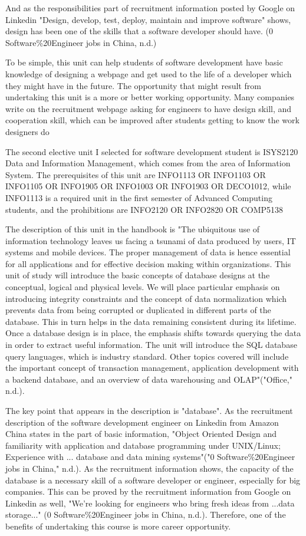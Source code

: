 \documentclass[12pt]{article}
\begin{document}
And as the responsibilities part of recruitment information posted by Google on Linkedin "Design, develop, test, deploy, maintain and improve software" shows, design has been one of the skills that a software developer should have. (0 Software\%20Engineer jobs in China, n.d.)

To be simple, this unit can help students of software development have basic knowledge of designing a webpage and get used to the life of a developer which they might have in the future.
The opportunity that might result from undertaking this unit is a more or better working opportunity. Many companies write on the recruitment webpage asking for engineers to have design skill, and cooperation skill, which can be improved after students getting to know the work designers do

The second elective unit I selected for software development student is ISYS2120 Data and Information Management, which comes from the area of Information System. The prerequisites of this unit are INFO1113 OR INFO1103 OR INFO1105 OR INFO1905 OR INFO1003 OR INFO1903 OR DECO1012, while INFO1113 is a required unit in the first semester of Advanced Computing students, and the prohibitions are INFO2120 OR INFO2820 OR COMP5138

The description of this unit in the handbook is "The ubiquitous use of information technology leaves us facing a tsunami of data produced by users, IT systems and mobile devices. The proper management of data is hence essential for all applications and for effective decision making within organizations.
This unit of study will introduce the basic concepts of database designs at the conceptual, logical and physical levels. We will place particular emphasis on introducing integrity constraints and the concept of data normalization which prevents data from being corrupted or duplicated in different parts of the database. This in turn helps in the data remaining consistent during its lifetime. Once a database design is in place, the emphasis shifts towards querying the data in order to extract useful information. The unit will introduce the SQL database query languages, which is industry standard. Other topics covered will include the important concept of transaction management, application development with a backend database, and an overview of data warehousing and OLAP"("Office," n.d.).

The key point that appears in the description is "database". As the recruitment description of the software development engineer on Linkedin from Amazon China states in the part of basic information, "Object Oriented Design and familiarity with application and database programming under UNIX/Linux; Experience with ... database and data mining systems"("0 Software\%20Engineer jobs in China," n.d.). As the recruitment information shows, the capacity of the database is a necessary skill of a software developer or engineer, especially for big companies. This can be proved by the recruitment information from Google on Linkedin as well, "We're looking for engineers who bring fresh ideas from ...data storage..." (0 Software\%20Engineer jobs in China, n.d.). Therefore, one of the benefits of undertaking this course is more career opportunity.
\end{document}
